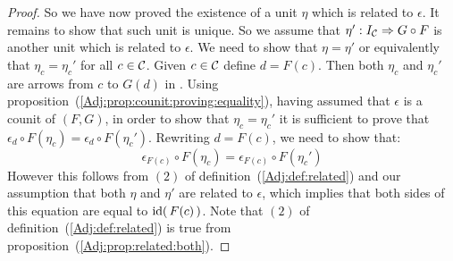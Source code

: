\begin{proof}
    So we have now proved the existence of a unit $\eta$ which is
    related to $\epsilon$. It remains to show that such unit is unique.
    So we assume that $\eta':I_{\cal C}\Rightarrow G\circ F$ is 
    another unit which is related to $\epsilon$. We need to show that
    $\eta=\eta'$ or equivalently that $\eta_{c}=\eta_{c}'$
    for all $c\in\mbox{$\cal C$}$. Given $c\in\mbox{$\cal C$}$ define $d=F(c)$. Then both 
    $\eta_{c}$ and $\eta_{c}'$ are arrows from $c$ to $G(d)$ in
    \Cat. Using proposition~(\ref{Adj:prop:counit:proving:equality}), having
    assumed that $\epsilon$ is a counit of $(F,G)$, in order to show that 
    $\eta_{c}=\eta_{c}'$ it is sufficient to prove that
    $\epsilon_{d}\circ F(\eta_{c})=\epsilon_{d}\circ F(\eta_{c}')$. Rewriting
    $d=F(c)$, we need to show that:
        \[
            \epsilon_{F(c)}\circ F(\eta_{c})=\epsilon_{F(c)}\circ F(\eta_{c}')
        \]
    However this follows from $(2)$ of definition~(\ref{Adj:def:related}) and
    our assumption that both $\eta$ and $\eta'$ are related to $\epsilon$,
    which implies that both sides of this equation are equal to $\mbox{\rm id}(\,F(c)\,)$.
    Note that $(2)$ of definition~(\ref{Adj:def:related}) is true from
    proposition~(\ref{Adj:prop:related:both}).
\end{proof}


